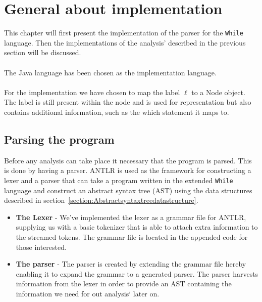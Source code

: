 {\setlength{\chapterfontsize}{24pt}
\chapter{General about implementation}
}
This chapter will first present the implementation of the parser for the \texttt{While} language. Then the implementations of the analysis' described in the previous section will be discussed.
\\\\
The Java language has been chosen as the implementation language.
\\\\
For the implementation we have chosen to map the label $\ell$ to a Node object. The label is still present within the node and is used for representation but also contains additional information, such as the which statement it maps to.

\section{Parsing the program}
Before any analysis can take place it necessary that the program is parsed. This is done by having a parser. ANTLR is used as the framework for constructing a lexer and a parser that can take a program written in the extended \texttt{While} language and construct an abstract syntax tree (AST) using the data structures described in section~\ref{section:Abstractsyntaxtreedatastructure}. 
\begin{itemize}
	\item \textbf{The Lexer} - We've implemented the lexer as a grammar file for ANTLR, supplying us with a basic tokenizer that is able to attach extra information to the streamed tokens. The grammar file is located in the appended code for those interested.
	\item \textbf{The parser} - The parser is created by extending the grammar file hereby enabling it to expand the grammar to a generated parser. The parser harvests information from the lexer in order to provide an AST containing the information we need for out analysis` later on.
\end{itemize}


